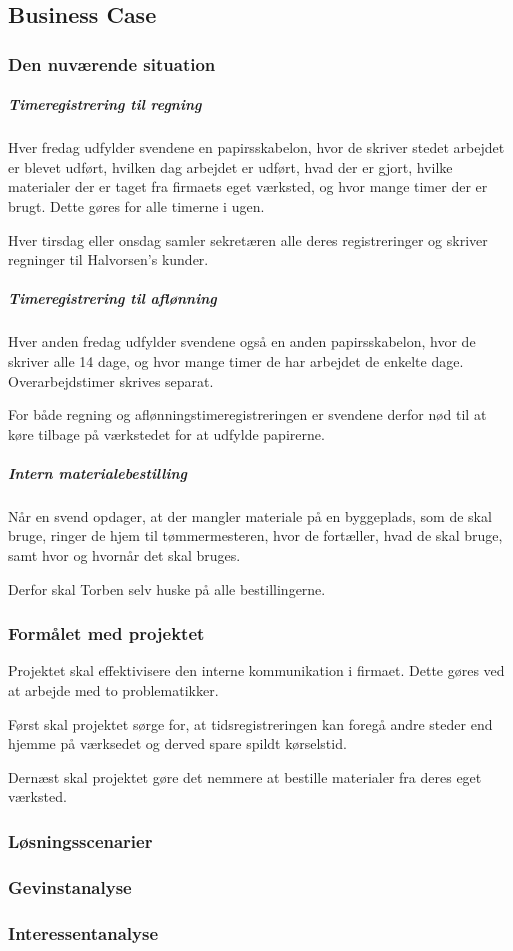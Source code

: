 \subsection{Business Case}
\subsubsection{Den nuværende situation}
\subparagraph{Timeregistrering til regning}

    Hver fredag udfylder svendene en papirsskabelon, hvor de skriver stedet arbejdet er blevet udført, hvilken dag arbejdet er udført, hvad der er gjort, hvilke materialer der er taget fra firmaets eget værksted, og hvor mange timer der er brugt.
    Dette gøres for alle timerne i ugen.
    
    Hver tirsdag eller onsdag samler sekretæren alle deres registreringer og skriver regninger til Halvorsen's kunder.

\subparagraph{Timeregistrering til aflønning}
    Hver anden fredag udfylder svendene også en anden papirsskabelon, hvor de skriver alle 14 dage, og hvor mange timer de har arbejdet de enkelte dage. Overarbejdstimer skrives separat.
    
    For både regning og aflønningstimeregistreringen er svendene derfor nød til at køre tilbage på værkstedet for at udfylde papirerne.
    
\subparagraph{Intern materialebestilling}
    Når en svend opdager, at der mangler materiale på en byggeplads, som de skal bruge, ringer de hjem til tømmermesteren, hvor de fortæller, hvad de skal bruge, samt hvor og hvornår det skal bruges.
    
    Derfor skal Torben selv huske på alle bestillingerne.
    
\subsubsection{Formålet med projektet}

    Projektet skal effektivisere den interne kommunikation i     firmaet.
    Dette gøres ved at arbejde med to problematikker.
    
    Først skal projektet sørge for, at tidsregistreringen kan foregå andre steder end hjemme på værksedet og derved spare spildt kørselstid.
    
    Dernæst skal projektet gøre det nemmere at bestille materialer fra deres eget værksted.

\subsubsection{Løsningsscenarier}

\subsubsection{Gevinstanalyse}

\subsubsection{Interessentanalyse}

